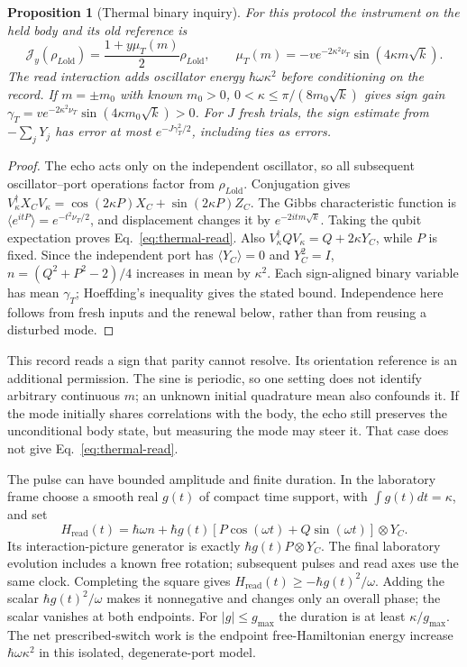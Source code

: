 \documentclass[aps,pre,onecolumn,superscriptaddress,floatfix,longbibliography]{revtex4-2}
\newtheorem{proposition}[theorem]{Proposition}
\begin{document}
\begin{proposition}[Thermal binary inquiry]\label{prop:thermal-read}
For this protocol the instrument on the held body and its old reference is
\begin{equation}\label{eq:thermal-read}
 \mathcal J_y(\rho_{L\mathrm{old}})
 =\frac{1+y\mu_T(m)}2\rho_{L\mathrm{old}},\qquad
 \mu_T(m)=-v e^{-2\kappa^2\nu_T}\sin(4\kappa m\sqrt{k}).
\end{equation}
The read interaction adds oscillator energy $\hbar\omega\kappa^2$
before conditioning on the record. If $m=\pm m_0$ with known $m_0>0$,
$0<\kappa\le\pi/(8m_0\sqrt{k})$ gives sign gain
$\gamma_T=v e^{-2\kappa^2\nu_T}\sin(4\kappa m_0\sqrt{k})>0$.
For $J$ fresh trials, the sign estimate from $-\sum_jY_j$ has error at most
$e^{-J\gamma_T^2/2}$, including ties as errors.
\end{proposition}
\begin{proof}
The echo acts only on the independent oscillator, so all subsequent
oscillator--port operations factor from $\rho_{L\mathrm{old}}$.
Conjugation gives
$V_\kappa^\dagger X_CV_\kappa
=\cos(2\kappa P)X_C+\sin(2\kappa P)Z_C$.
The Gibbs characteristic function is
$\langle e^{itP}\rangle=e^{-t^2\nu_T/2}$, and displacement changes it by
$e^{-2itm\sqrt{k}}$. Taking the qubit expectation proves
Eq.~\eqref{eq:thermal-read}. Also
$V_\kappa^\dagger QV_\kappa=Q+2\kappa Y_C$, while $P$ is fixed.
Since the independent port has $\langle Y_C\rangle=0$ and $Y_C^2=I$,
$n=(Q^2+P^2-2)/4$ increases in mean by $\kappa^2$.
Each sign-aligned binary variable has mean $\gamma_T$; Hoeffding's
inequality gives the stated bound. Independence here follows from fresh
inputs and the renewal below, rather than from reusing a disturbed mode.
\end{proof}

This record reads a sign that parity cannot resolve. Its orientation
reference is an additional permission. The sine is periodic, so one setting
does not identify arbitrary continuous $m$; an unknown initial quadrature
mean also confounds it. If the mode initially shares correlations with the
body, the echo still preserves the unconditional body state, but measuring
the mode may steer it. That case does not give Eq.~\eqref{eq:thermal-read}.

The pulse can have bounded amplitude and finite duration. In the laboratory
frame choose a smooth real $g(t)$ of compact time support, with
$\int g(t)dt=\kappa$, and set
\begin{equation}\label{eq:thermal-read-H}
 H_{\mathrm{read}}(t)=\hbar\omega n+
 \hbar g(t)[P\cos(\omega t)+Q\sin(\omega t)]\otimes Y_C.
\end{equation}
Its interaction-picture generator is exactly $\hbar g(t)P\otimes Y_C$.
The final laboratory evolution includes a known free rotation; subsequent
pulses and read axes use the same clock. Completing the square gives
$H_{\mathrm{read}}(t)\ge-\hbar g(t)^2/\omega$.
Adding the scalar $\hbar g(t)^2/\omega$ makes it nonnegative and changes
only an overall phase; the scalar vanishes at both endpoints.
For $|g|\le g_{\max}$ the duration is at least $\kappa/g_{\max}$.
The net prescribed-switch work is the endpoint free-Hamiltonian energy increase
$\hbar\omega\kappa^2$ in this isolated, degenerate-port model.
\end{document}
